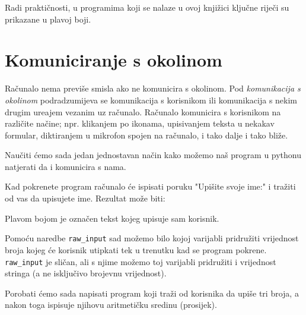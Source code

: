 	Radi prakti\v{c}nosti, u programima koji se nalaze u ovoj knji\v{z}ici klju\v{c}ne
	rije\v{c}i su prikazane u plavoj boji.

\section{Komuniciranje s okolinom}

	Ra\v cunalo nema previ\v se smisla ako ne komunicira s okolinom. Pod
	\emph{komunikacija s okolinom} podradzumijeva se komunikacija s korisnikom ili
	komunikacija s nekim drugim ure\dj{}ajem vezanim uz ra\v cunalo. Ra\v cunalo
	komunicira s korisnikom na razli\v cite na\v cine; npr. klikanjem po ikonama,
	upisivanjem teksta u nekakav formular, diktiranjem u mikrofon spojen 
	na ra\v cunalo, i tako dalje i tako bli\v ze.

	Nau\v citi \' cemo sada jedan jednostavan na\v cin kako mo\v zemo na\v s program u
	pythonu natjerati da i komunicira s nama.


	Kad pokrenete program ra\v cunalo \' ce ispisati poruku "Upi\v site svoje ime:" i
	tra\v ziti od vas da upisujete ime. Rezultat mo\v ze biti:


	Plavom bojom je ozna\v cen tekst kojeg upisuje sam korisnik.

	Pomo\' cu naredbe \verb+raw_input+ sad mo\v zemo bilo kojoj varijabli 
	pridru\v ziti vrijednost broja kojeg \'{c}e korisnik utipkati tek u trenutku kad 
	se program pokrene. \verb"raw_input" je sli\v{c}an, ali s njime mo\v{z}emo toj
	varijabli pridru\v{z}iti i vrijednost stringa (a ne isklju\v{c}ivo brojevnu
	vrijednost).

	Porobati \' cemo sada napisati program koji tra\v zi od korisnika da upi\v se 
	tri broja, a nakon toga ispisuje njihovu aritmeti\v cku sredinu (prosijek).


